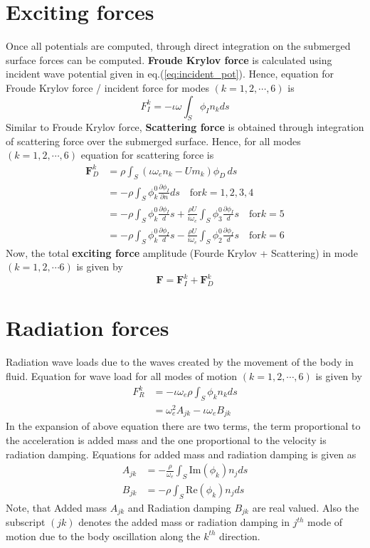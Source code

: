 \section{Exciting forces}
Once all potentials are computed, through direct integration on the submerged surface forces 
can be computed.
{\bf Froude Krylov force} is calculated using incident wave potential given in eq.(\ref{eq:incident_pot}). Hence, 
equation for Froude Krylov force / incident force for modes $(k=1, 2, \cdots, 6)$ is 
\begin{equation}
    F_I^k = -\iota \omega\int_{S} \phi_I n_k ds
\end{equation}
Similar to Froude Krylov force, {\bf Scattering force} is obtained through integration of scattering force over the 
submerged surface. Hence, for all modes $(k=1, 2, \cdots, 6)$ equation for scattering force is 
\begin{align}
    \boldsymbol{F}_D^k &= \rho \int_{S}(\iota \omega_e n_k - Um_k)\phi_D\,ds \\ \nonumber
    &= -\rho \int_{S}\phi_k^0\frac{\partial \phi_I}{\partial n} ds \quad \text{for} k=1, 2, 3, 4 \\ \nonumber 
    &= -\rho \int_{S}\phi_k^0\frac{\partial \phi_I} ds + \frac{\rho U}{i\omega_e}\int_{S}\phi^0_3 
    \frac{\partial \phi_I} ds \quad \text{for} k=5 \\ \nonumber
    &= -\rho \int_{S}\phi_k^0\frac{\partial \phi_I} ds - \frac{\rho U}{i\omega_e}\int_{S}\phi^0_2
    \frac{\partial \phi_I} ds \quad \text{for} k=6
\end{align}
Now, the total {\bf exciting force} amplitude (Fourde Krylov + Scattering) in mode $(k=1, 2, \cdots 6)$ is given by 
\begin{equation}
    \boldsymbol{F} = \boldsymbol{F}^k_I + \boldsymbol{F}^k_D 
\end{equation}
\section{Radiation forces}
Radiation wave loads due to the waves created by the movement of the body in 
fluid. Equation for wave load for all modes of motion $(k=1, 2, \cdots, 6)$ is given by 
\begin{align}
    F_R^k &= -\iota \omega_e \rho \int_{S}\phi_k n_k ds \\ \nonumber
          &= \omega_e^2 A_{jk} - \iota \omega_e B_{jk}
\end{align}
In the expansion of above equation there are two terms, the term proportional to the acceleration is 
added mass and the one proportional to the velocity is radiation damping. Equations for added mass and
radiation damping is given as 
\begin{align}
    A_{jk} &= -\frac{\rho}{\omega_e}\int_{S}\text{Im}(\phi_k) n_j ds \\ 
    B_{jk} &= -\rho \int_{S} \text{Re}(\phi_k)n_j ds 
\end{align}
Note, that Added mass $A_{jk}$ and Radiation damping $B_{jk}$ are real valued. Also the subscript $(jk)$ denotes
the added mass or radiation damping in $j^{th}$ mode of motion due to the body oscillation along the 
$k^{th}$ direction.
